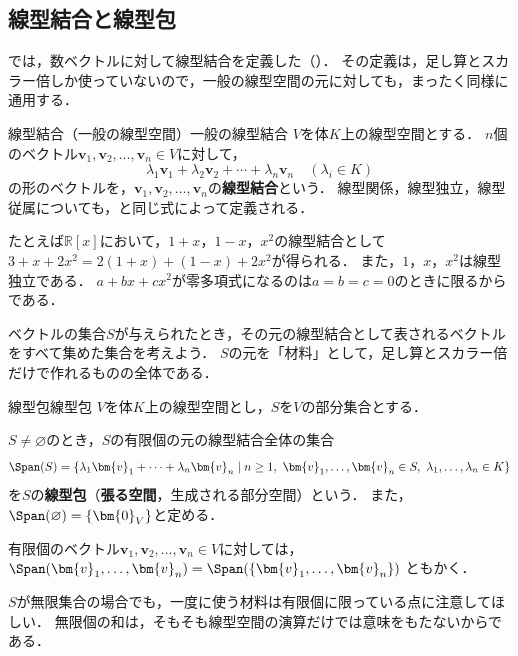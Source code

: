 \subsection{線型結合と線型包}

では，数ベクトルに対して線型結合を定義した（）．
その定義は，足し算とスカラー倍しか使っていないので，一般の線型空間の元に対しても，まったく同様に通用する．

\begin{definition}{線型結合（一般の線型空間）}{一般の線型結合}
  $V$を体$K$上の線型空間とする．
  $n$個のベクトル$\bm{v}_1, \bm{v}_2, \dots, \bm{v}_n \in V$に対して，
  \[
    \lambda_1 \bm{v}_1 + \lambda_2 \bm{v}_2 + \cdots + \lambda_n \bm{v}_n
    \quad (\lambda_i \in K)
  \]
  の形のベクトルを，$\bm{v}_1, \bm{v}_2, \dots, \bm{v}_n$の\textbf{線型結合}という．
  線型関係，線型独立，線型従属についても，と同じ式によって定義される．
\end{definition}

たとえば$\mathbb{R}[x]$において，$1+x$，$1-x$，$x^2$の線型結合として$3+x+2x^2=2(1+x)+(1-x)+2x^2$が得られる．
また，$1$，$x$，$x^2$は線型独立である．
$a+bx+cx^2$が零多項式になるのは$a=b=c=0$のときに限るからである．

ベクトルの集合$S$が与えられたとき，その元の線型結合として表されるベクトルをすべて集めた集合を考えよう．
$S$の元を「材料」として，足し算とスカラー倍だけで作れるものの全体である．

\begin{definition}{線型包}{線型包}
  $V$を体$K$上の線型空間とし，$S$を$V$の部分集合とする．

  $S \neq \varnothing$のとき，$S$の有限個の元の線型結合全体の集合
  \[
    \Span(S)
    = \{ \lambda_1 \bm{v}_1 + \cdots + \lambda_n \bm{v}_n \mid n \ge 1,\ \bm{v}_1, \dots, \bm{v}_n \in S,\ \lambda_1, \dots, \lambda_n \in K \}
  \]
  を$S$の\textbf{線型包}（\textbf{張る空間}，生成される部分空間）という．
  また，$\Span(\varnothing) = \{\bm{0}_V\}$と定める．

  有限個のベクトル$\bm{v}_1, \bm{v}_2, \dots, \bm{v}_n \in V$に対しては，
  $\Span(\bm{v}_1, \dots, \bm{v}_n) = \Span(\{\bm{v}_1, \dots, \bm{v}_n\})$
  ともかく．
\end{definition}

$S$が無限集合の場合でも，一度に使う材料は有限個に限っている点に注意してほしい．
無限個の和は，そもそも線型空間の演算だけでは意味をもたないからである．

